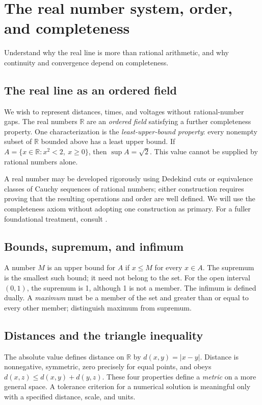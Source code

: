 \chapter{The real number system, order, and completeness}\label{ch:reals}
\begin{readergoal}Understand why the real line is more than rational arithmetic, and why continuity and convergence depend on completeness.\end{readergoal}
\section{The real line as an ordered field}
We wish to represent distances, times, and voltages without rational-number gaps. The real numbers $\mathbb R$ are an \emph{ordered field} satisfying a further completeness property. One characterization is the \emph{least-upper-bound property}: every nonempty subset of $\mathbb R$ bounded above has a least upper bound. If $A=\{x\in\mathbb R:x^2<2,\ x\ge0\}$, then $\sup A=\sqrt2$. This value cannot be supplied by rational numbers alone.

A real number may be developed rigorously using Dedekind cuts or equivalence classes of Cauchy sequences of rational numbers; either construction requires proving that the resulting operations and order are well defined. We will use the completeness axiom without adopting one construction as primary. For a fuller foundational treatment, consult \cite{MendelsonNumbers}.

\section{Bounds, supremum, and infimum}
A number $M$ is an upper bound for $A$ if $x\le M$ for every $x\in A$. The supremum is the smallest such bound; it need not belong to the set. For the open interval $(0,1)$, the supremum is 1, although 1 is not a member. The infimum is defined dually. A \emph{maximum} must be a member of the set and greater than or equal to every other member; distinguish maximum from supremum.

\section{Distances and the triangle inequality}
The absolute value defines distance on $\mathbb R$ by $d(x,y)=|x-y|$. Distance is nonnegative, symmetric, zero precisely for equal points, and obeys $d(x,z)\le d(x,y)+d(y,z)$. These four properties define a \emph{metric} on a more general space. A tolerance criterion for a numerical solution is meaningful only with a specified distance, scale, and units.


